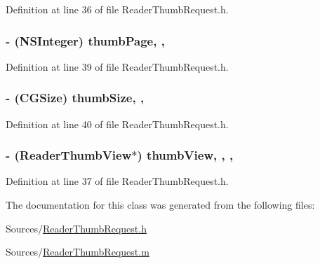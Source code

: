 Definition at line 36 of file Reader\-Thumb\-Request.\-h.

\hypertarget{interface_reader_thumb_request_a34178f66256a286b1936cd5951979928}{
\subsubsection[{thumb\-Page}]{\setlength{\rightskip}{0pt plus 5cm}-\/ (N\-S\-Integer) thumb\-Page\hspace{0.3cm}{\ttfamily [read]}, {\ttfamily [nonatomic]}, {\ttfamily [assign]}}}\label{dc/dc5/interface_reader_thumb_request_a34178f66256a286b1936cd5951979928}


Definition at line 39 of file Reader\-Thumb\-Request.\-h.

\hypertarget{interface_reader_thumb_request_ab9dfcc6d38c38033127dd553b170435b}{
\subsubsection[{thumb\-Size}]{\setlength{\rightskip}{0pt plus 5cm}-\/ (C\-G\-Size) thumb\-Size\hspace{0.3cm}{\ttfamily [read]}, {\ttfamily [nonatomic]}, {\ttfamily [assign]}}}\label{dc/dc5/interface_reader_thumb_request_ab9dfcc6d38c38033127dd553b170435b}


Definition at line 40 of file Reader\-Thumb\-Request.\-h.

\hypertarget{interface_reader_thumb_request_ab188b120cf0ddaa698106bd5f0ba672d}{
\subsubsection[{thumb\-View}]{\setlength{\rightskip}{0pt plus 5cm}-\/ ({\bf Reader\-Thumb\-View}$\ast$) thumb\-View\hspace{0.3cm}{\ttfamily [read]}, {\ttfamily [write]}, {\ttfamily [nonatomic]}, {\ttfamily [strong]}}}\label{dc/dc5/interface_reader_thumb_request_ab188b120cf0ddaa698106bd5f0ba672d}


Definition at line 37 of file Reader\-Thumb\-Request.\-h.



The documentation for this class was generated from the following files\-:\begin{DoxyCompactItemize}
\item 
Sources/\hyperlink{_reader_thumb_request_8h}{Reader\-Thumb\-Request.\-h}\item 
Sources/\hyperlink{_reader_thumb_request_8m}{Reader\-Thumb\-Request.\-m}\end{DoxyCompactItemize}
